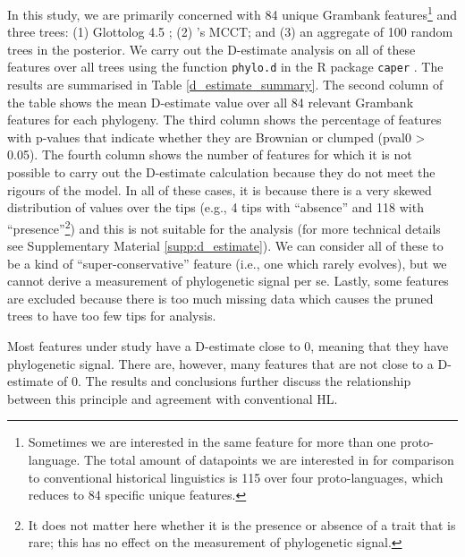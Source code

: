 \documentclass[12pt,letterpaper]{article}
\begin{document}
In this study, we are primarily concerned with 84 unique Grambank features\footnote{Sometimes we are interested in the same feature for more than one proto-language. The total amount of datapoints we are interested in for comparison to conventional historical linguistics is 115 over four proto-languages, which reduces to 84 specific unique features.} and three trees: (1) Glottolog 4.5 \citep{glottolog4_5}; (2) \citet{grayetal_2009}'s MCCT; and (3) an aggregate of 100 random trees in the \citet{grayetal_2009} posterior. We carry out the D-estimate analysis on all of these features over all trees using the function \texttt{phylo.d} in the R package \texttt{caper} \citep{orme2013caper}. The results are summarised in Table \ref{d_estimate_summary}. The second column of the table shows the mean D-estimate value over all 84 relevant Grambank features for each phylogeny. The third column shows the percentage of features with p-values that indicate whether they are Brownian or clumped (pval0 > 0.05). The fourth column shows the number of features for which it is not possible to carry out the D-estimate calculation because they do not meet the rigours of the model. In all of these cases, it is because there is a very skewed distribution of values over the tips (e.g., 4 tips with ``absence'' and 118 with ``presence''\footnote{It does not matter here whether it is the presence or absence of a trait that is rare; this has no effect on the measurement of phylogenetic signal.}) and this is not suitable for the analysis (for more technical details see Supplementary Material \ref{supp:d_estimate}). We can consider all of these to be a kind of ``super-conservative'' feature (i.e., one which rarely evolves), but we cannot derive a measurement of phylogenetic signal per se. Lastly, some features are excluded because there is too much missing data which causes the pruned trees to have too few tips for analysis.



Most features under study have a D-estimate close to 0, meaning that they have phylogenetic signal. There are, however, many features that are not close to a D-estimate of 0. The results and conclusions further discuss the relationship between this principle and agreement with conventional HL.
\end{document}
